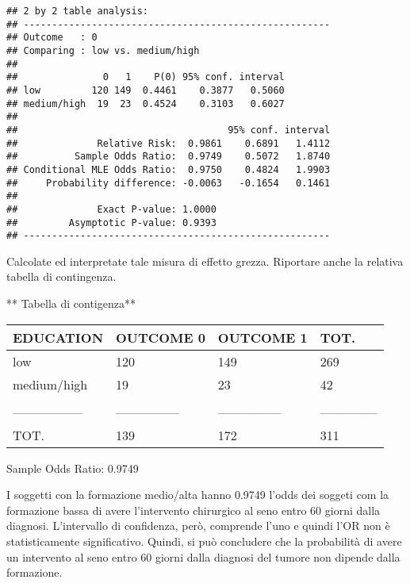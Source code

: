 \documentclass[]{article}
\newenvironment{Shaded}{\begin{snugshade}}{\end{snugshade}}
\newcommand{\KeywordTok}[1]{\textcolor[rgb]{0.13,0.29,0.53}{\textbf{#1}}}
\newcommand{\NormalTok}[1]{#1}
\newcommand{\OperatorTok}[1]{\textcolor[rgb]{0.81,0.36,0.00}{\textbf{#1}}}
\begin{document}
\begin{Shaded}
\end{Shaded}

\begin{verbatim}
## 2 by 2 table analysis: 
## ------------------------------------------------------ 
## Outcome   : 0 
## Comparing : low vs. medium/high 
## 
##               0   1    P(0) 95% conf. interval
## low         120 149  0.4461    0.3877   0.5060
## medium/high  19  23  0.4524    0.3103   0.6027
## 
##                                     95% conf. interval
##              Relative Risk:  0.9861    0.6891   1.4112
##          Sample Odds Ratio:  0.9749    0.5072   1.8740
## Conditional MLE Odds Ratio:  0.9750    0.4824   1.9903
##     Probability difference: -0.0063   -0.1654   0.1461
## 
##              Exact P-value: 1.0000 
##         Asymptotic P-value: 0.9393 
## ------------------------------------------------------
\end{verbatim}

Calcolate ed interpretate tale misura di effetto grezza. Riportare anche
la relativa tabella di contingenza.

** Tabella di contigenza**

\begin{longtable}[]{@{}llll@{}}
\toprule
EDUCATION & OUTCOME 0 & OUTCOME 1 & TOT.\tabularnewline
\midrule
\endhead
low & 120 & 149 & 269\tabularnewline
medium/high & 19 & 23 & 42\tabularnewline
& & &\tabularnewline
----------------- & --------------- & --------------- &
--------------\tabularnewline
TOT. & 139 & 172 & 311\tabularnewline
\bottomrule
\end{longtable}

Sample Odds Ratio: 0.9749

I soggetti con la formazione medio/alta hanno 0.9749 l'odds dei soggeti
com la formazione bassa di avere l'intervento chirurgico al seno entro
60 giorni dalla diagnosi. L'intervallo di confidenza, però, comprende
l'uno e quindi l'OR non è statisticamente significativo. Quindi, si può
concludere che la probabilità di avere un intervento al seno entro 60
giorni dalla diagnosi del tumore non dipende dalla formazione.
\end{document}

